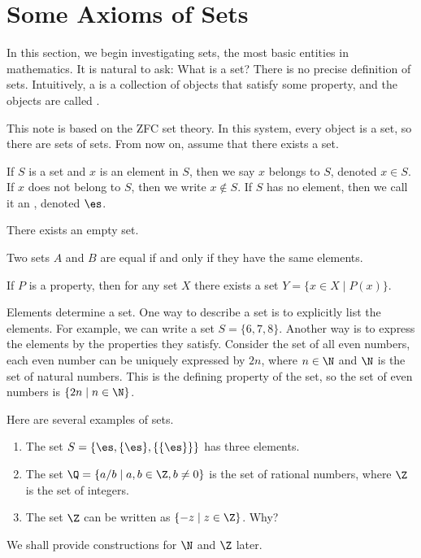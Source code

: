 \documentclass[10pt]{article}
\begin{document}
\section{Some Axioms of Sets}
\par
In this section, we begin investigating sets, the most basic entities in mathematics. It is natural to ask: What is a set? There is no precise definition of sets. Intuitively, a  is a collection of objects that satisfy some property, and the objects are called .
\begin{remark}
    This note is based on the ZFC set theory. In this system, every object is a set, so there are sets of sets. From now on, assume that there exists a set.
\end{remark}
\par
If $S$ is a set and $x$ is an element in $S$, then we say $x$ belongs to $S$, denoted $x\in S$. If $x$ does not belong to $S$, then we write $x\notin S$. If $S$ has no element, then we call it an , denoted $\es$.
\begin{Axiom of empty set}
    There exists an empty set.
\end{Axiom of empty set}
\begin{Axiom of extensionality}
    Two sets $A$ and $B$ are equal if and only if they have the same elements.
\end{Axiom of extensionality}
\begin{Axiom schema of separation}
    If $P$ is a property, then for any set $X$ there exists a set $Y=\{x\in X\mid P(x)\}$.
\end{Axiom schema of separation}
\par
Elements determine a set. One way to describe a set is to explicitly list the elements. For example, we can write a set $S=\{6,7,8\}$. Another way is to express the elements by the properties they satisfy. Consider the set of all even numbers, each even number can be uniquely expressed by $2n$, where $n\in\N$ and $\N$ is the set of natural numbers. This is the defining property of the set, so the set of even numbers is $\{2n\mid n\in\N\}$.
\begin{example}
    Here are several examples of sets.
    \begin{enumerate}
        \item The set $S=\{\es,\{\es\},\{\{\es\}\}\}$ has three elements.
        \item The set $\Q=\{a/b\mid a,b\in\Z,b\ne 0\}$ is the set of rational numbers, where $\Z$ is the set of integers.
        \item The set $\Z$ can be written as $\{-z\mid z\in\Z\}$. Why?
    \end{enumerate}
    We shall provide constructions for $\N$ and $\Z$ later.
\end{example}
\end{document}
